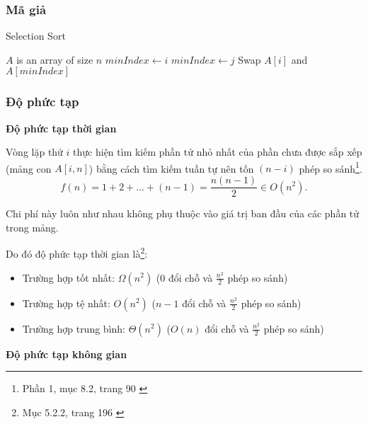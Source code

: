 \subsubsection{Mã giả}
 
\begin{algorithm}
\caption{Selection Sort}
\label{alg:selection-sort}
\begin{algorithmic}

\Require $A$ is an array of size $n$
    \State $minIndex \gets i$ 
            \State $minIndex \gets j$ 
        \EndIf
    \EndFor
    \State Swap $A[i]$ and $A[minIndex]$ 
\EndFor
\EndFunction

\end{algorithmic}
\end{algorithm}

\subsubsection{Độ phức tạp}

\textbf{Độ phức tạp thời gian}

Vòng lặp thứ $i$ thực hiện tìm kiếm phần tử nhỏ nhất của phần chưa được sắp xếp (mảng con $A[i,n]$) bằng cách tìm kiếm tuần tự nên tốn $(n-i)$ phép so sánh\footnote{Phần 1, mục 8.2, trang 90 \cite{hoang1999giaithuat}
}.
$$f(n) = 1 + 2 + ... + (n-1) = \frac{n(n-1)}{2} \in O(n^2).$$ 

Chi phí này luôn như nhau không phụ thuộc vào giá trị ban đầu của các phần tử trong mảng.

Do đó độ phức tạp thời gian là\footnote{Mục 5.2.2, trang 196 \cite{dsa_nghia_2013}}:

\begin{itemize}
    \item Trường hợp tốt nhất: $\Omega(n^2)$ (0 đổi chỗ và $\frac{n^2}{2}$ phép so sánh)
    \item Trường hợp tệ nhất: $O(n^2)$ ($n-1$ đổi chỗ và $\frac{n^2}{2}$ phép so sánh)
    \item Trường hợp trung bình: $\Theta(n^2)$ ($O(n)$ đổi chỗ và $\frac{n^2}{2}$ phép so sánh)
\end{itemize}


\textbf{Độ phức tạp không gian}

